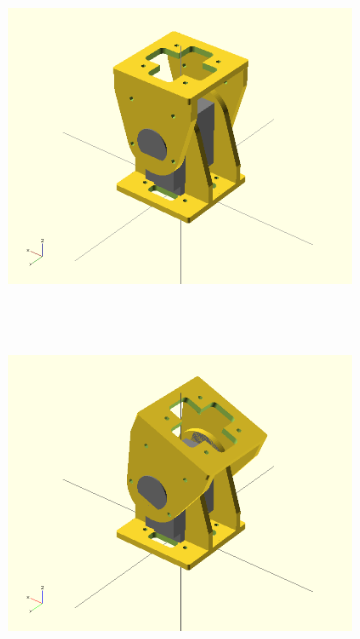 \begin{figure}[h]
		\centering
        \begin{subfigure}[b]{0.18\textwidth}
                \centering
                \includegraphics[width=\textwidth]{images/Gait_osc_center_90.png}
                 ~
                \label{fig:Gait_osc_center_90}
        \end{subfigure}
        ~
        \begin{subfigure}[b]{0.18\textwidth}
                \centering
                \includegraphics[width=\textwidth]{images/Gait_osc_center_112_5.png}
                 ~
                \label{fig:Gait_osc_center_112_5}

\end{subfigure}
\end{figure}
